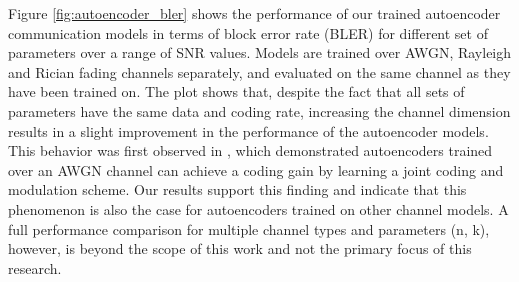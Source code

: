 Figure \ref{fig:autoencoder_bler} shows the performance of our trained autoencoder communication models in terms of block error rate (BLER) for different set of parameters over a range of SNR values. Models are trained over AWGN, Rayleigh and Rician fading channels separately, and evaluated on the same channel as they have been trained on. The plot shows that, despite the fact that all sets of parameters have the same data and coding rate, increasing the channel dimension results in a slight improvement in the performance of the autoencoder models. This behavior was first observed in \cite{o2017introduction}, which demonstrated autoencoders trained over an AWGN channel can achieve a coding gain by learning a joint coding and modulation scheme. Our results support this finding and indicate that this phenomenon is also the case for autoencoders trained on other channel models. A full performance comparison for multiple channel types and parameters (n, k), however, is beyond the scope of this work and not the primary focus of this research.

